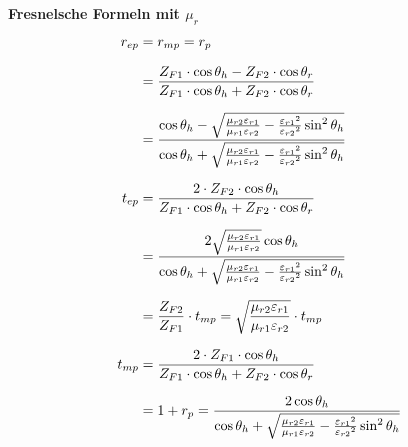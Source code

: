 \textbf{Fresnelsche Formeln mit $\mu_r$}
\begin{equation*}
	\setlength{\jot}{10pt}
	\begin{aligned}
		r_{ep}    & =  r_{mp} = r_{p} 
		\\
		& = \frac{Z_{F1} \cdot \cos \theta_h-Z_{F2} \cdot \cos \theta_r}{Z_{F1} \cdot \cos \theta_h+Z_{F2} \cdot \cos \theta_r}
		\\
		& =\frac{\cos \theta_h-\sqrt{\frac{\mu_{r 2} \varepsilon_{r 1}}{\mu_{r 1} \varepsilon_{r 2}}-\frac{\varepsilon_{r 1}{ }^2}{\varepsilon_{r 2}{ }^2} \sin ^2 \theta_h}}{\cos \theta_h+\sqrt{\frac{\mu_{r 2} \varepsilon_{r 1}}{\mu_{r 1} \varepsilon_{r 2}}-\frac{\varepsilon_{r 1}{ }^2}{\varepsilon_{r 2}{} ^2} \sin ^2 \theta_h}} 
        \\
		t_{ep} & =  \frac{2 \cdot Z_{F2}   \cdot  \cos \theta_h}{Z_{F1} \cdot \cos \theta_h+Z_{F2} \cdot \cos \theta_r}
        \\                                                                                                                                                                                                                                                                                         
        &=\frac{2 \sqrt{\frac{\mu_{r 2} \varepsilon_{r 1}}{\mu_{r 1} \varepsilon_{r 2}}} \cos \theta_h}{\cos \theta_h+\sqrt{\frac{\mu_{r 2} \varepsilon_{r 1}}{\mu_{r 1} \varepsilon_{r 2}}-\frac{\varepsilon_{r 1}{ }^2}{\varepsilon_{r 2}{ }^2} \sin ^2 \theta_h}} 
        \\
		& = \frac{Z_{F2}}{Z_{F1}}\cdot t_{mp} = \sqrt{\frac{\mu_{r2}\varepsilon_{r1}}{\mu_{r1}\varepsilon_{r2}}}\cdot t_{mp} 
		\\
		t_{mp} & = \frac{2 \cdot  Z_{F1}\cdot \cos \theta_h}{Z_{F1} \cdot \cos \theta_h+Z_{F2} \cdot \cos \theta_r}                    
        \\
		& = 1+r_p =\frac{2 \cos \theta_h}{\cos \theta_h+\sqrt{\frac{\mu_{r 2} \varepsilon_{r 1}}{\mu_{r 1} \varepsilon_{r 2}}-\frac{\varepsilon_{r 1}{ }^2}{\varepsilon_{r 2}{ }^2} \sin ^2 \theta_h}}  		
	\end{aligned}
\end{equation*}